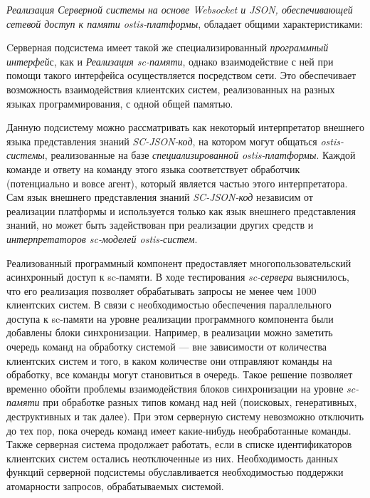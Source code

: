 \textit{Реализация Серверной системы на основе Websocket и JSON, обеспечивающей сетевой доступ к памяти ostis-платформы}, обладает  общими характеристиками:
\begin{textitemize}
    \item Cерверная подсистема имеет такой же специализированный \textit{программный интерфей}с, как и \textit{Реализация sc-памяти}, однако взаимодействие с ней при помощи такого интерфейса осуществляется посредством сети. Это обеспечивает возможность взаимодействия клиентских систем, реализованных на разных языках программирования, с одной общей памятью.
    \item Данную подсистему можно рассматривать как некоторый интерпретатор внешнего языка представления знаний \textit{SC-JSON-код}, на котором могут общаться \textit{ostis-системы}, реализованные на базе \textit{специализированной ostis-платформы}. Каждой команде и ответу на команду этого языка соответствует обработчик (потенциально и вовсе агент), который является частью этого интерпретатора. Сам язык внешнего представления знаний \textit{SC-JSON-код} независим от реализации платформы и используется только как язык внешнего представления знаний, но может быть задействован при реализации других средств и \textit{интерпретаторов sc-моделей ostis-систем}.
    \item Реализованный программный компонент предоставляет многопользовательский асинхронный доступ к sc-памяти. В ходе тестирования \textit{sc-сервера} выяснилось, что его реализация позволяет обрабатывать запросы не менее чем 1000 клиентских систем. В связи с необходимостью обеспечения параллельного доступа к sc-памяти на уровне реализации программного компонента были добавлены блоки синхронизации. Например, в реализации можно заметить очередь команд на обработку системой --- вне зависимости от количества клиентских систем и того, в каком количестве они отправляют команды на обработку, все команды могут становиться в очередь. Такое решение позволяет временно обойти проблемы взаимодействия блоков синхронизации на уровне \textit{sc-памяти} при обработке разных типов команд над ней (поисковых, генеративных, деструктивных и так далее). При этом серверную систему невозможно отключить до тех пор, пока очередь команд имеет какие-нибудь необработанные команды. Также серверная система продолжает работать, если в списке идентификаторов клиентских систем остались неотключенные из них. Необходимость данных функций серверной подсистемы обуславливается необходимостью поддержки атомарности запросов, обрабатываемых системой.

\end{textitemize}
